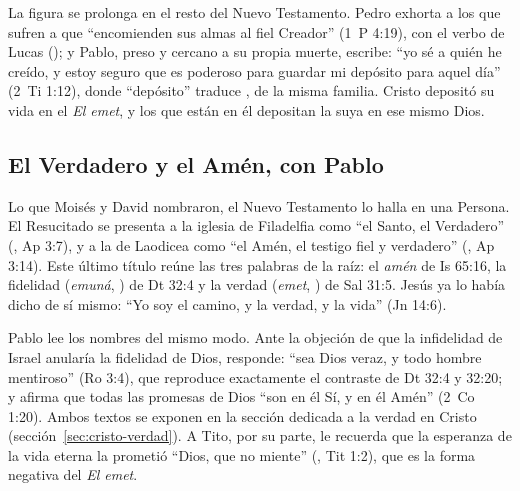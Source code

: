 La figura se prolonga en el resto del Nuevo Testamento. Pedro exhorta a los que sufren a que ``encomienden sus almas al fiel Creador'' (1~P 4:19), con el verbo de Lucas (); y Pablo, preso y cercano a su propia muerte, escribe: ``yo sé a quién he creído, y estoy seguro que es poderoso para guardar mi depósito para aquel día'' (2~Ti 1:12), donde ``depósito'' traduce , de la misma familia. Cristo depositó su vida en el \emph{El emet}, y los que están en él depositan la suya en ese mismo Dios.

\subsection{El Verdadero y el Amén, con Pablo}
Lo que Moisés y David nombraron, el Nuevo Testamento lo halla en una Persona. El Resucitado se presenta a la iglesia de Filadelfia como ``el Santo, el Verdadero'' (, Ap 3:7), y a la de Laodicea como ``el Amén, el testigo fiel y verdadero'' (, Ap 3:14). Este último título reúne las tres palabras de la raíz: el \emph{amén} de Is 65:16, la fidelidad (\emph{emuná}, ) de Dt 32:4 y la verdad (\emph{emet}, ) de Sal 31:5. Jesús ya lo había dicho de sí mismo: ``Yo soy el camino, y la verdad, y la vida'' (Jn 14:6).

Pablo lee los nombres del mismo modo. Ante la objeción de que la infidelidad de Israel anularía la fidelidad de Dios, responde: ``sea Dios veraz, y todo hombre mentiroso'' (Ro 3:4), que reproduce exactamente el contraste de Dt 32:4 y 32:20; y afirma que todas las promesas de Dios ``son en él Sí, y en él Amén'' (2~Co 1:20). Ambos textos se exponen en la sección dedicada a la verdad en Cristo (sección~\ref{sec:cristo-verdad}). A Tito, por su parte, le recuerda que la esperanza de la vida eterna la prometió ``Dios, que no miente'' (, Tit 1:2), que es la forma negativa del \emph{El emet}.

